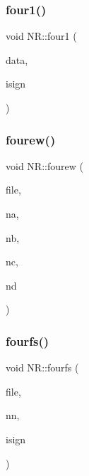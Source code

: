 \subsubsection{\texorpdfstring{four1()}{four1()}}
{\footnotesize\ttfamily void N\+R\+::four1 (\begin{DoxyParamCaption}\item[{\mbox{\hyperlink{namespaceNR_ab293e06a6bf799d8a7ed932b6852bcb8}{Vec\+\_\+\+I\+O\+\_\+\+DP}} \&}]{data,  }\item[{const int}]{isign }\end{DoxyParamCaption})}

\mbox{\label{namespaceNR_a8dd403b5378f2cc7dec76ae5b837f05d}} 
\subsubsection{\texorpdfstring{fourew()}{fourew()}}
{\footnotesize\ttfamily void N\+R\+::fourew (\begin{DoxyParamCaption}\item[{\mbox{\hyperlink{namespaceNR_ace6a74f7f9700e1416d49842d8ac29ea}{Vec\+\_\+\+F\+S\+T\+R\+E\+A\+M\+\_\+p}} \&}]{file,  }\item[{int \&}]{na,  }\item[{int \&}]{nb,  }\item[{int \&}]{nc,  }\item[{int \&}]{nd }\end{DoxyParamCaption})}

\mbox{\label{namespaceNR_a9d15130e265a84a6b1e78c63c1af4e34}} 
\subsubsection{\texorpdfstring{fourfs()}{fourfs()}}
{\footnotesize\ttfamily void N\+R\+::fourfs (\begin{DoxyParamCaption}\item[{\mbox{\hyperlink{namespaceNR_ace6a74f7f9700e1416d49842d8ac29ea}{Vec\+\_\+\+F\+S\+T\+R\+E\+A\+M\+\_\+p}} \&}]{file,  }\item[{\mbox{\hyperlink{namespaceNR_ae67ce7dc86a8a64a7ce73c3c030ff610}{Vec\+\_\+\+I\+\_\+\+I\+NT}} \&}]{nn,  }\item[{const int}]{isign }\end{DoxyParamCaption})}

